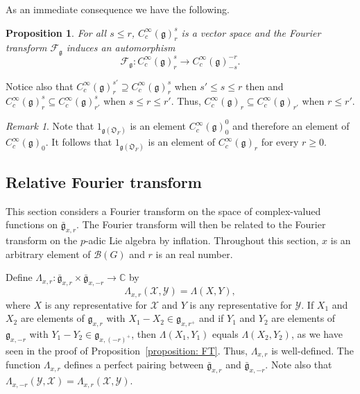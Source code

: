 \documentclass[11pt]{amsart}
\newtheorem{proposition}[theorem]{Proposition}
\theoremstyle{definition}
\theoremstyle{remark}
\newtheorem{remark}[theorem]{Remark}
\numberwithin{equation}{theorem}
\def\C{{\mathbb{C}}}
\def\F{{F}}
\def\A{{\mathfrak{O}_\F}}
\def\GF{{G}}
\def\gF{{\mathfrak{g}}}
\newcommand{\mf}{{\bar\gF}}
\def\X{{\mathcal{X}}}
\def\Y{{\mathcal{Y}}}
\def\kill#1#2{{\Lambda\left({#1},{#2}\right)}}
\def\B{{\mathcal{B}}}
\def\Fourier{{\mathcal{F}}}
\def\Sch#1{{C^\infty_c(#1)}}
\begin{document}
As an immediate consequence we have the following.
\begin{proposition}\label{proposition: depth r Hecke}
For all $s\leq r$, $\Sch{\gF}^s_r$ is a vector space and the
Fourier transform $\Fourier_\gF$ induces an automorphism
\begin{equation}
\Fourier_\gF : \Sch{\gF}^s_r \to \Sch{\gF}^{-r}_{-s}.
\end{equation}
\end{proposition}

Notice also that $\Sch{\gF}^{s'}_r \supseteq
\Sch{\gF}^s_r$ when $s'\leq s \leq r$ then and $\Sch{\gF}^s_{r}
\subseteq \Sch{\gF}^s_{r'}$ when $s \leq r \leq r'$.
Thus, $\Sch{\gF}_r \subseteq \Sch{\gF}_{r'}$ when $r\leq r'$.

\begin{remark}\label{remark: unit}
Note that $1_{\gF(\A)}$ is an element $\Sch{\gF}_0^0$ and therefore an element of $\Sch{\gF}_0$.
It follows that $1_{\gF(\A)}$ is an element of $\Sch{\gF}_r$ for every $r\geq 0$.
\end{remark}



\subsection{Relative Fourier transform}\label{section: relative
Fourier transform}

This section considers a Fourier transform on the space of
complex-valued functions on $\mf_{x,r}$. The Fourier transform
will then be related to the Fourier transform on the $p$-adic Lie
algebra by inflation. Throughout this section, $x$ is an arbitrary
element of $\B(\GF)$ and $r$ is an real number.

Define $\Lambda_{x,r}:\mf_{x,r}\times\mf_{x,-r}\to\C$ by
\begin{equation}
\Lambda_{x,r}(\X,\Y) = \kill{X}{Y},
\end{equation}
where $X$ is any representative for $\X$ and $Y$ is any
representative for $\Y$. If $X_1$ and $X_2$ are elements of
$\gF_{x,r}$ with $X_1-X_2\in \gF_{x,r^+}$ and if $Y_1$ and $Y_2$
are elements of $\gF_{x,-r}$ with $Y_1-Y_2\in \gF_{x,(-r)^+}$,
then $\kill{X_1}{Y_1}$ equals $\kill{X_2}{Y_2}$, as we have seen
in the proof of Proposition~\ref{proposition: FT}. Thus,
$\Lambda_{x,r}$ is well-defined. The function $\Lambda_{x,r}$
defines a perfect pairing between $\mf_{x,r}$ and $\mf_{x,-r}$.
Note also that $\Lambda_{x,-r}(\Y,\X) = \Lambda_{x,r}(\X,\Y)$.
\end{document}
